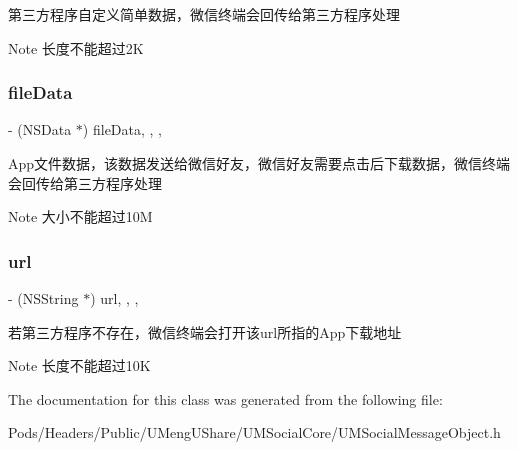 第三方程序自定义简单数据，微信终端会回传给第三方程序处理 \begin{DoxyNote}{Note}
长度不能超过2K 
\end{DoxyNote}
\mbox{\label{interface_u_m_share_extend_object_af0ae0aa0fd9e10d33b517c25515dbc5f}} 
\subsubsection{\texorpdfstring{file\+Data}{fileData}}
{\footnotesize\ttfamily -\/ (N\+S\+Data $\ast$) file\+Data\hspace{0.3cm}{\ttfamily [read]}, {\ttfamily [write]}, {\ttfamily [nonatomic]}, {\ttfamily [retain]}}

App文件数据，该数据发送给微信好友，微信好友需要点击后下载数据，微信终端会回传给第三方程序处理 \begin{DoxyNote}{Note}
大小不能超过10M 
\end{DoxyNote}
\mbox{\label{interface_u_m_share_extend_object_aaa43f6d63bb8ee3c37c4e644e9fe6052}} 
\subsubsection{\texorpdfstring{url}{url}}
{\footnotesize\ttfamily -\/ (N\+S\+String $\ast$) url\hspace{0.3cm}{\ttfamily [read]}, {\ttfamily [write]}, {\ttfamily [nonatomic]}, {\ttfamily [retain]}}

若第三方程序不存在，微信终端会打开该url所指的\+App下载地址 \begin{DoxyNote}{Note}
长度不能超过10K 
\end{DoxyNote}


The documentation for this class was generated from the following file\+:\begin{DoxyCompactItemize}
\item 
Pods/\+Headers/\+Public/\+U\+Meng\+U\+Share/\+U\+M\+Social\+Core/U\+M\+Social\+Message\+Object.\+h\end{DoxyCompactItemize}
